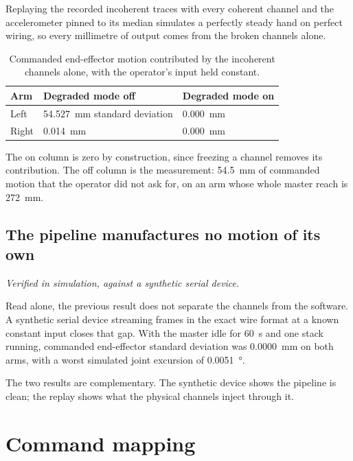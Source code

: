 Replaying the recorded incoherent traces with every coherent channel and the
accelerometer pinned to its median simulates a perfectly steady hand on
perfect wiring, so every millimetre of output comes from the broken channels
alone.

\begin{table}[htbp]
  \centering
  \caption{Commanded end-effector motion contributed by the incoherent
  channels alone, with the operator's input held constant.}
  \label{tab:vibration}
  \begin{tabular}{@{}lll@{}}
    \toprule
    Arm & Degraded mode off & Degraded mode on \\
    \midrule
    Left  & \SI{54.527}{\milli\metre} standard deviation & \SI{0.000}{\milli\metre} \\
    Right & \SI{0.014}{\milli\metre} & \SI{0.000}{\milli\metre} \\
    \bottomrule
  \end{tabular}
\end{table}

The on column is zero by construction, since freezing a channel removes its
contribution. The off column is the measurement: \SI{54.5}{\milli\metre} of
commanded motion that the operator did not ask for, on an arm whose whole
master reach is \SI{272}{\milli\metre}.

\subsection{The pipeline manufactures no motion of its own}

\emph{Verified in simulation, against a synthetic serial device.}

Read alone, the previous result does not separate the channels from the
software. A synthetic serial device streaming frames in the exact wire format
at a known constant input closes that gap. With the master idle for
\SI{60}{\second} and one stack running, commanded end-effector standard
deviation was \SI{0.0000}{\milli\metre} on both arms, with a worst simulated
joint excursion of \SI{0.0051}{\degree}.

The two results are complementary. The synthetic device shows the pipeline is
clean; the replay shows what the physical channels inject through it.

\section{Command mapping}

